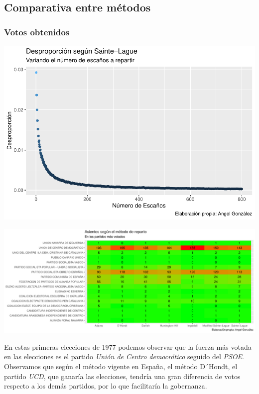 \documentclass[12pt,a4paper,]{book}
\numberwithin{dummy}{section}
\theoremstyle{ocrenumbox}
\theoremstyle{blacknumex}
\theoremstyle{blacknumbox}
\theoremstyle{ocrenum}
\theoremstyle{ocrenum}
\begin{document}
\hypertarget{comparativa-entre-muxe9todos}{%
\subsection{Comparativa entre
métodos}\label{comparativa-entre-muxe9todos}}

\hypertarget{votos-obtenidos}{%
\subsubsection{Votos obtenidos}\label{votos-obtenidos}}

\begin{center}\includegraphics[width=0.95\linewidth]{figurasR/unnamed-chunk-11-1} \end{center}

\begin{center}\includegraphics[width=0.95\linewidth]{figurasR/unnamed-chunk-11-2} \end{center}

En estas primeras elecciones de 1977 podemos observar que la fuerza más
votada en las elecciones es el partido \emph{Unión de Centro
democrático} seguido del \emph{PSOE}. Observamos que según el método
vigente en España, el método D´Hondt, el partido \emph{UCD}, que ganaría
las elecciones, tendría una gran diferencia de votos respecto a los
demás partidos, por lo que facilitaría la gobernanza.
\end{document}
